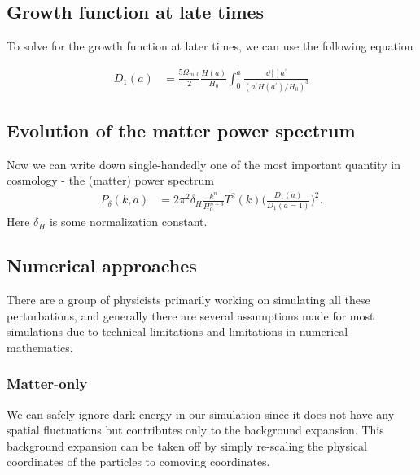 \documentclass[a4paper, 12pt]{article}
\begin{document}
{{              \subsection{Growth function at late times}%
                \label{sub:Growth function at late times}
                  To solve for the growth function at later
                  times, we can use the following equation 

                  \begin{align}
                    \label{growth function at late times}
                    D_1(a) &= \frac{5 \Omega_{m,0}}{2}
                    \frac{H(a)}{H_0} \int_{0}^{a}
                    \frac{\dd[]{a^{\prime}}}{(a^{\prime}H(a^{\prime})/H_0)^3} 
                  \end{align}

              \subsection{Evolution of the matter power
              spectrum}%
                \label{sub:Evolution of the matter power
                            spectrum}
                Now we can write down single-handedly one of the
                most important quantity in cosmology - the
                (matter) power spectrum 
                \begin{align}
                  \label{matter power spectrum}
                  P_{\delta}(k, a) &= 2 \pi^2 \delta_{H}
                  \frac{k^n}{H_{0}^{n+3}} T^{2}(k)
                  \bigg(\frac{D_1(a)}{D_1(a=1)} \bigg)^{2}.
                \end{align} Here \( \delta_H \) is some
                normalization constant. 

                \subsection{Numerical approaches}%
                  \label{sub:Numerical approaches}
                  
                  There are a group of physicists primarily
                working on simulating all these perturbations,
                and generally there are several assumptions made
                for most simulations due to technical limitations
                and limitations in numerical mathematics. 

                \subsubsection{Matter-only}%
                  \label{sub:Matter-only}
                  We can safely ignore dark energy in our
                  simulation since it does not have any spatial
                  fluctuations but contributes only to the
                  background expansion. This background expansion
                  can be taken off by simply re-scaling the
                  physical coordinates of the particles to
                  comoving coordinates. 

}}
\end{document}

